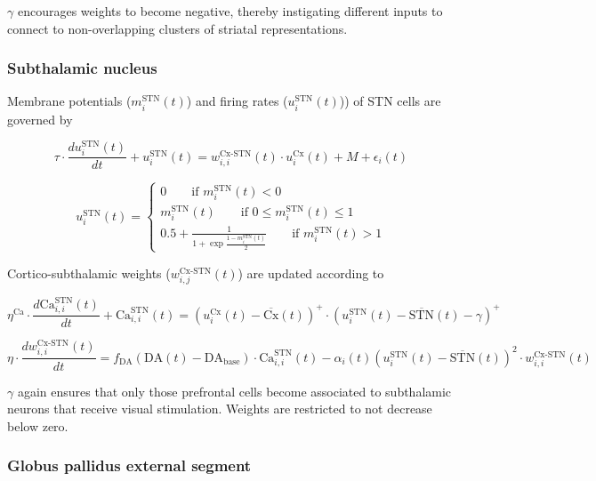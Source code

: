 \documentclass[
  11pt,
  a4paper,
]{scrbook}
\begin{document}
\(\gamma\) encourages weights to become negative, thereby instigating
different inputs to connect to non-overlapping clusters of striatal
representations.

\subsubsection*{Subthalamic nucleus}\label{subthalamic-nucleus-1}

Membrane potentials (\(m_i^\text{STN}(t)\)) and firing rates
(\(u_i^\text{STN}(t)\))) of STN cells are governed by

\[
 \tau \cdot \frac{d u_i^\text{STN}(t)}{dt} + u_i^\text{STN}(t) = w_{i,i}^\text{Cx-STN}(t) \cdot u_i^\text{Cx}(t) + M +  \epsilon_i(t)
\]

\[
 u_i^\text{STN}(t) = \begin{cases}
                    0 \qquad \text{if } m_i^\text{STN} (t) <  0 \\
                    m_i^\text{STN} (t) \qquad \text{if } 0 \leq m_i^\text{STN} (t) \leq 1 \\
                    0.5 + \frac{1}{1 + \exp \frac{1 - m_i^\text{STN}(t)}{2} } \qquad \text{if } m_i^\text{STN}(t) > 1
                    \end{cases}
\]

Cortico-subthalamic weights (\(w_{i,j}^\text{Cx-STN}(t)\)) are updated
according to

\[
  \eta^\text{Ca} \cdot \frac{d \text{Ca}_{i,i}^\text{STN}(t)}{dt} + \text{Ca}_{i,i}^\text{STN}(t) = (u_i^\text{Cx}(t) - \overline{\text{Cx}}(t))^+ \cdot (u_i^\text{STN}(t) - \overline{\text{STN}}(t) -\gamma)^+
\]

\[
  \eta \cdot \frac{d w_{i,i}^\text{Cx-STN}(t)}{dt} = f_\text{DA}(\text{DA}(t)-\text{DA}_\text{base}) \cdot \text{Ca}_{i,i}^\text{STN}(t)- \alpha_i(t) (u_i^\text{STN}(t) - \overline{\text{STN}}(t))^2 \cdot w_{i,i}^\text{Cx-STN}(t)
\]

\(\gamma\) again ensures that only those prefrontal cells become
associated to subthalamic neurons that receive visual stimulation.
Weights are restricted to not decrease below zero.

\subsubsection*{Globus pallidus external
segment}\label{globus-pallidus-external-segment-1}
\end{document}
